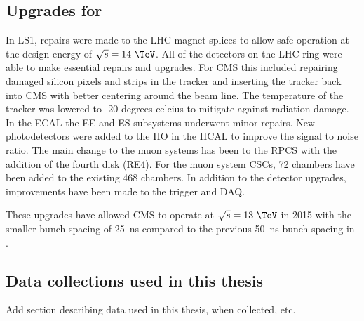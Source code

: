 \subsection{Upgrades for \runtwo}

In LS1, repairs were made to the LHC magnet splices to allow safe operation at the design energy of $\sqrt{s} = 14~\TeV$. All of the detectors on the LHC ring were able to make essential repairs and upgrades. For CMS this included repairing damaged silicon pixels and strips in the tracker and inserting the tracker back into CMS with better centering around the beam line. The temperature of the tracker was lowered to -20 degrees celcius to mitigate against radiation damage. In the ECAL the EE and ES subsystems underwent minor repairs. New photodetectors were added to the HO in the HCAL to improve the signal to noise ratio. The main change to the muon systems has been to the RPCS with the addition of the fourth disk (RE4). For the muon system CSCs, 72 chambers have been added to the existing 468 chambers. In addition to the detector upgrades, improvements have been made to the trigger and DAQ.

These upgrades have allowed CMS to operate at $\sqrt{s} = 13~\TeV$ in 2015 with the smaller bunch spacing of 25~ns compared to the previous 50~ns bunch spacing in \runone.

\subsection{Data collections used in this thesis}
Add section describing data used in this thesis, when collected, etc.




